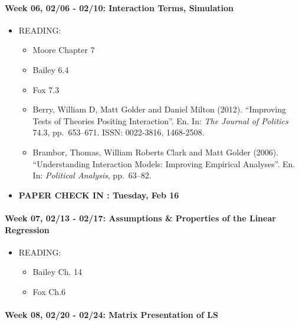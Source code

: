 \documentclass[11pt,]{article}
\providecommand{\tightlist}{%
  \setlength{\itemsep}{0pt}\setlength{\parskip}{0pt}}
\begin{document}
\paragraph{Week 06, 02/06 - 02/10: Interaction Terms,
Simulation}\label{week-06-0206---0210-interaction-terms-simulation}

\begin{itemize}
\tightlist
\item
  READING:

  \begin{itemize}
  \item
    Moore Chapter 7
  \item
    Bailey 6.4
  \item
    Fox 7.3
  \item
     Berry, William D, Matt Golder and Daniel Milton
    (2012). ``Improving Tests of Theories Positing Interaction''. En.
    In: \emph{The Journal of Politics} 74.3, pp.~653--671. ISSN:
    0022-3816, 1468-2508.
  \item
     Brambor, Thomas, William Roberts Clark and Matt
    Golder (2006). ``Understanding Interaction Models: Improving
    Empirical Analyses''. En. In: \emph{Political Analysis}, pp.~63--82.
  \end{itemize}
\item
  \textbf{PAPER CHECK IN : Tuesday, Feb 16 }
\end{itemize}

\paragraph{Week 07, 02/13 - 02/17: Assumptions \& Properties of the
Linear
Regression}\label{week-07-0213---0217-assumptions-properties-of-the-linear-regression}

\begin{itemize}
\tightlist
\item
  READING:

  \begin{itemize}
  \tightlist
  \item
    Bailey Ch. 14
  \item
    Fox Ch.6
  \end{itemize}
\end{itemize}

\paragraph{Week 08, 02/20 - 02/24: Matrix Presentation of
LS}\label{week-08-0220---0224-matrix-presentation-of-ls}
\end{document}
